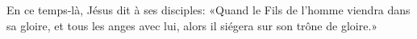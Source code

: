 En ce temps-là, Jésus dit à ses disciples:
	«Quand le Fils de l’homme viendra dans sa gloire,
	et tous les anges avec lui,
	alors il siégera sur son trône de gloire.»
